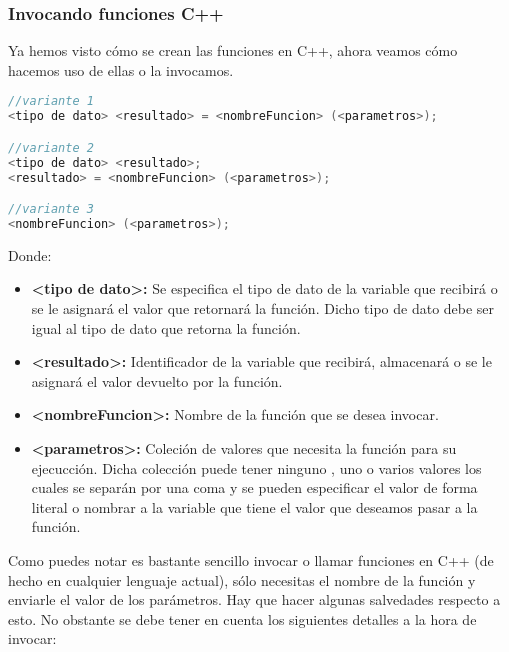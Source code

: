 \subsubsection{Invocando funciones C++}

Ya hemos visto cómo se crean las funciones en C++, ahora veamos cómo hacemos uso de ellas o la invocamos.

\begin{lstlisting}[language=C++]
//variante 1
<tipo de dato> <resultado> = <nombreFuncion> (<parametros>);

//variante 2
<tipo de dato> <resultado>;
<resultado> = <nombreFuncion> (<parametros>);

//variante 3
<nombreFuncion> (<parametros>);
\end{lstlisting}

Donde:

\begin{itemize}
	\item \textbf{<tipo de dato>:} Se especifica el tipo de dato de la variable que recibirá o se le asignará el valor que retornará la función. Dicho tipo de dato debe ser igual al tipo de dato que retorna la función.
	\item \textbf{<resultado>:} Identificador de la variable que recibirá, almacenará o se le asignará el valor devuelto por la función. 
	\item \textbf{<nombreFuncion>:} Nombre de la función que se desea invocar.
	\item \textbf{<parametros>:} Coleción de valores que necesita la función para su ejecucción. Dicha colección puede tener ninguno , uno o varios valores los cuales se separán por una coma y se pueden especificar el valor de forma literal o nombrar a la variable que tiene el valor que deseamos pasar a la función. 
\end{itemize}

Como puedes notar es bastante sencillo invocar o llamar funciones en C++ (de hecho en cualquier lenguaje actual), sólo necesitas el nombre de la función y enviarle el valor de los parámetros. Hay que hacer algunas salvedades respecto a esto. No obstante se debe tener en cuenta los siguientes detalles a la hora de invocar:

